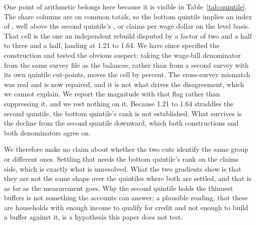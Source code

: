 One point of arithmetic belongs here because it is visible in Table~\ref{tab:quintile}. The
share columns are on common totals, so the bottom quintile implies an index of
, well above the second quintile's , or  claims
per wage dollar on the level basis. That cell is the one an independent rebuild disputed by a factor of two
and a half to three and a half, landing at 1.21 to 1.64. We have since specified the
construction and tested the obvious suspect: taking the wage-bill denominator from the same
survey file as the balances, rather than from a second survey with its own quintile cut-points,
moves the cell by  percent. The cross-survey mismatch was real and is now
repaired, and it is not what drives the disagreement, which we cannot explain. We report the
magnitude with that flag rather than suppressing it, and we rest nothing on it. Because 1.21 to
1.64 straddles the second quintile, the bottom quintile's rank is not established. What survives
is the decline from the second quintile downward, which both constructions and both denominators
agree on.

We therefore make no claim about whether the two cuts identify the same group or different
ones. Settling that needs the bottom quintile's rank on the claims side, which is exactly what
is unresolved. What the two gradients show is that they are not the same shape over the
quintiles where both are settled, and that is as far as the measurement goes. Why the second quintile
holds the thinnest buffers is not something the accounts can answer; a plausible reading, that
these are households with enough income to qualify for credit and not enough to build a buffer
against it, is a hypothesis this paper does not test.
